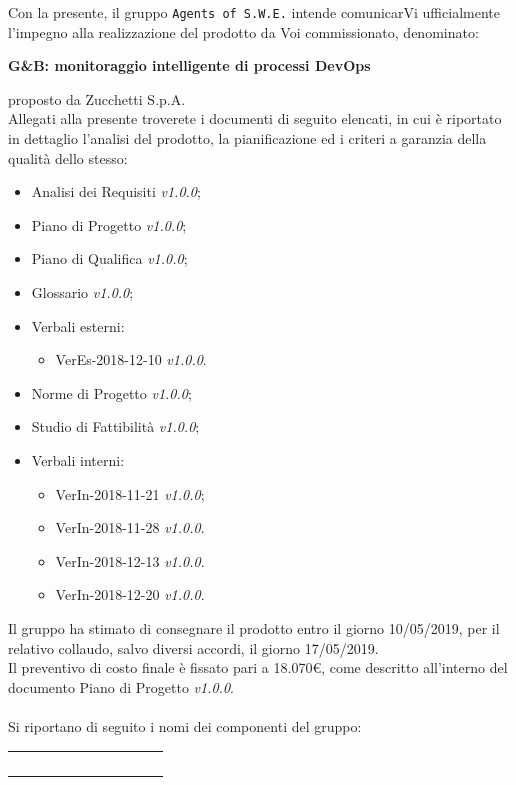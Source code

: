 \documentclass[11pt, a4paper]{letter} %
\begin{document}
\begin{letter}
Con la presente, il gruppo \texttt{Agents of S.W.E.} intende comunicarVi ufficialmente l'impegno alla realizzazione del prodotto da Voi commissionato, denominato:
\begin{center}
	\textbf{G\&B: monitoraggio intelligente di processi DevOps}
\end{center}
proposto da Zucchetti S.p.A.\\
Allegati alla presente troverete i documenti di seguito elencati, in cui è riportato in dettaglio l'analisi del prodotto, la pianificazione ed i criteri a garanzia della qualità dello stesso:
\begin{itemize}
	\item Analisi dei Requisiti \textit{v1.0.0};
	\item Piano di Progetto \textit{v1.0.0};
	\item Piano di Qualifica \textit{v1.0.0};
	\item Glossario \textit{v1.0.0};
	\item Verbali esterni: 
		\begin{itemize}
			\item VerEs-2018-12-10 \textit{v1.0.0}.
		\end{itemize}
	\item Norme di Progetto \textit{v1.0.0};	
	\item Studio di Fattibilità \textit{v1.0.0};
	\item Verbali interni: 
		\begin{itemize}
			\item VerIn-2018-11-21 \textit{v1.0.0};
			\item VerIn-2018-11-28 \textit{v1.0.0}.
			\item VerIn-2018-12-13 \textit{v1.0.0}.
			\item VerIn-2018-12-20 \textit{v1.0.0}.
		\end{itemize}
\end{itemize}
Il gruppo ha stimato di consegnare il prodotto entro il giorno 10/05/2019, per il relativo collaudo, salvo diversi accordi, il giorno 17/05/2019.\\  
Il preventivo di costo finale è fissato pari a 18.070€, come descritto all'interno del documento Piano di Progetto \textit{v1.0.0}.\\
\-\\
Si riportano di seguito i nomi dei componenti del gruppo:
\begin{center}
\begin{longtable}[c]{|m{}m{}|} 
\hline
\rowcolor{bluelogo}\textbf{\textcolor{white}{Membro}}  & \textbf{\textcolor{white}{Matricola}}\\

\end{longtable}
\end{center}
\end{letter}
\end{document}
